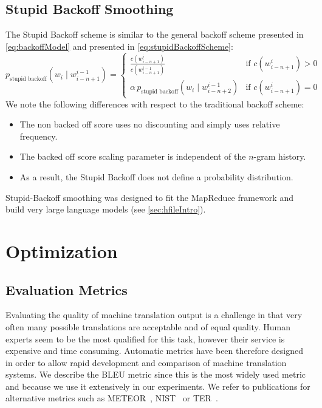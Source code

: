 \subsection{Stupid Backoff Smoothing}
\label{sec:stupidBackoffSmoothing}

The Stupid Backoff scheme is similar to
the general backoff scheme presented in \autoref{eq:backoffModel}
and presented in \autoref{eq:stupidBackoffScheme}:
%
\begin{equation}
  p_{\text{stupid backoff}}(w_i \mid w_{i - n + 1}^{i - 1}) =
  \begin{cases}
    \frac{c(w_{i - n + 1}^i)}{c(w_{i - n + 1}^{i - 1})} & \text{if } c(w_{i - n + 1}^i) > 0 \\
    \alpha \, p_{\text{stupid backoff}}(w_i \mid w_{i - n + 2}^{i - 1}) & \text{if } c(w_{i - n + 1}^i) = 0
  \end{cases}
  \label{eq:stupidBackoffScheme}  
\end{equation}
%
We note the following differences with respect to the traditional backoff
scheme:
%
\begin{itemize}
  \item The non backed off score uses no discounting and simply uses relative frequency.
  \item The backed off score scaling parameter is independent of
    the $n$-gram history.
  \item As a result, the Stupid Backoff does not define a probability distribution.
\end{itemize}
%
Stupid-Backoff smoothing was designed to fit the MapReduce framework
and build very large language models (see \autoref{sec:hfileIntro}).


\section{Optimization}
\label{sec:optimization}

    \subsection{Evaluation Metrics}

    Evaluating the quality of machine translation output is a challenge in that very often many possible
    translations are acceptable and of equal quality. Human experts seem to be the most qualified for this task, however
    their service is expensive and time consuming. Automatic metrics have been therefore designed
    in order to allow rapid development and comparison of machine translation systems. We describe
    the BLEU metric since this is the most widely used metric and because we use it extensively in our experiments.
    We refer to publications for alternative metrics such as 
    METEOR~\citep{banerjee-lavie:2005:MTSumm}, NIST~\citep{doddington:2002:HLTR} or
    TER~\citep{snover-dorr-schwartz-micciulla-makhoul:2006:AMTA}.

